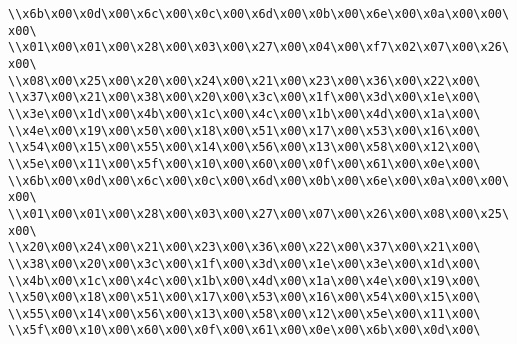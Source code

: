 \verb|\\x6b\x00\x0d\x00\x6c\x00\x0c\x00\x6d\x00\x0b\x00\x6e\x00\x0a\x00\x00\x00\|\newline
\verb|\\x01\x00\x01\x00\x28\x00\x03\x00\x27\x00\x04\x00\xf7\x02\x07\x00\x26\x00\|\newline
\verb|\\x08\x00\x25\x00\x20\x00\x24\x00\x21\x00\x23\x00\x36\x00\x22\x00\|\newline
\verb|\\x37\x00\x21\x00\x38\x00\x20\x00\x3c\x00\x1f\x00\x3d\x00\x1e\x00\|\newline
\verb|\\x3e\x00\x1d\x00\x4b\x00\x1c\x00\x4c\x00\x1b\x00\x4d\x00\x1a\x00\|\newline
\verb|\\x4e\x00\x19\x00\x50\x00\x18\x00\x51\x00\x17\x00\x53\x00\x16\x00\|\newline
\verb|\\x54\x00\x15\x00\x55\x00\x14\x00\x56\x00\x13\x00\x58\x00\x12\x00\|\newline
\verb|\\x5e\x00\x11\x00\x5f\x00\x10\x00\x60\x00\x0f\x00\x61\x00\x0e\x00\|\newline
\verb|\\x6b\x00\x0d\x00\x6c\x00\x0c\x00\x6d\x00\x0b\x00\x6e\x00\x0a\x00\x00\x00\|\newline
\verb|\\x01\x00\x01\x00\x28\x00\x03\x00\x27\x00\x07\x00\x26\x00\x08\x00\x25\x00\|\newline
\verb|\\x20\x00\x24\x00\x21\x00\x23\x00\x36\x00\x22\x00\x37\x00\x21\x00\|\newline
\verb|\\x38\x00\x20\x00\x3c\x00\x1f\x00\x3d\x00\x1e\x00\x3e\x00\x1d\x00\|\newline
\verb|\\x4b\x00\x1c\x00\x4c\x00\x1b\x00\x4d\x00\x1a\x00\x4e\x00\x19\x00\|\newline
\verb|\\x50\x00\x18\x00\x51\x00\x17\x00\x53\x00\x16\x00\x54\x00\x15\x00\|\newline
\verb|\\x55\x00\x14\x00\x56\x00\x13\x00\x58\x00\x12\x00\x5e\x00\x11\x00\|\newline
\verb|\\x5f\x00\x10\x00\x60\x00\x0f\x00\x61\x00\x0e\x00\x6b\x00\x0d\x00\|\newline
